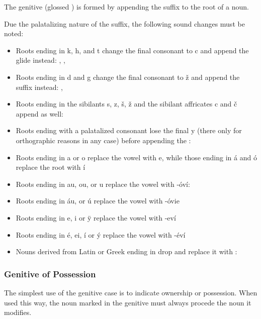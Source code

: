 The genitive (glossed \Gen{}) is formed by appending the suffix  to the root of a noun.

Due the palatalizing nature of the suffix, the following sound changes must be noted:

\begin{itemize}
	\item Roots ending in k, h, and t change the final consonant to c and append the glide  instead:  ,  ,  
	\item Roots ending in d and g change the final consonant to ž and append the suffix  instead:  ,  
	\item Roots ending in the sibilants s, z, š, ž and the sibilant affricates c and č append  as well:
	\item Roots ending with a palatalized consonant lose the final y (there only for orthographic reasons in any case) before appending the : 
	\item Roots ending in a or o replace the vowel with e, while those ending in á and ó replace the root with í
	\item Roots ending in au, ou, or u replace the vowel with -óví:  
	\item Roots ending in áu, or ú replace the vowel with -óvie
	\item Roots ending in e, i or \"y replace the vowel with -eví
	\item Roots ending in é, ei, í or \'y replace the vowel with -éví
  \item Nouns derived from Latin or Greek ending in  drop  and replace it with : 
\end{itemize}


\subsubsection{Genitive of Possession}

The simplest use of the genitive case is to indicate ownership or possession.
When used this way, the noun marked in the genitive must always procede the noun
it modifies.


\pex
{}\\
\\
\xe

